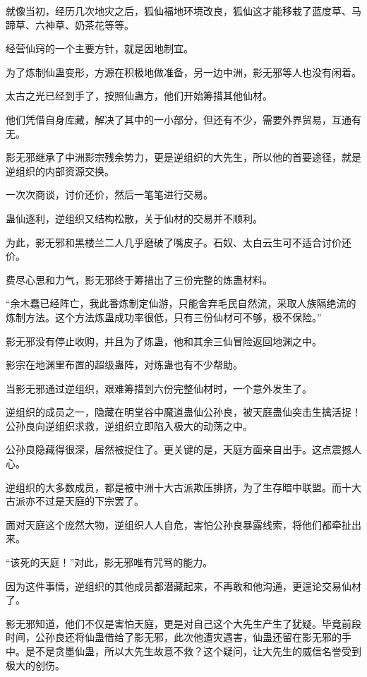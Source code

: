 \begin{this_body}
就像当初，经历几次地灾之后，狐仙福地环境改良，狐仙这才能移栽了蓝度草、马蹄草、六神草、奶茶花等等。

经营仙窍的一个主要方针，就是因地制宜。

为了炼制仙蛊变形，方源在积极地做准备，另一边中洲，影无邪等人也没有闲着。

太古之光已经到手了，按照仙蛊方，他们开始筹措其他仙材。

他们凭借自身库藏，解决了其中的一小部分，但还有不少，需要外界贸易，互通有无。

影无邪继承了中洲影宗残余势力，更是逆组织的大先生，所以他的首要途径，就是逆组织的内部资源交换。

一次次商谈，讨价还价，然后一笔笔进行交易。

蛊仙逐利，逆组织又结构松散，关于仙材的交易并不顺利。

为此，影无邪和黑楼兰二人几乎磨破了嘴皮子。石奴、太白云生可不适合讨价还价。

费尽心思和力气，影无邪终于筹措出了三份完整的炼蛊材料。

“余木蠢已经阵亡，我此番炼制定仙游，只能舍弃毛民自然流，采取人族隔绝流的炼制方法。这个方法炼蛊成功率很低，只有三份仙材可不够，极不保险。”

影无邪没有停止收购，并且为了炼蛊，他和其余三仙冒险返回地渊之中。

影宗在地渊里布置的超级蛊阵，对炼蛊也有不少帮助。

当影无邪通过逆组织，艰难筹措到六份完整仙材时，一个意外发生了。

逆组织的成员之一，隐藏在明堂谷中魔道蛊仙公孙良，被天庭蛊仙突击生擒活捉！公孙良向逆组织求救，逆组织立即陷入极大的动荡之中。

公孙良隐藏得很深，居然被捉住了。更关键的是，天庭方面亲自出手。这点震撼人心。

逆组织的大多数成员，都是被中洲十大古派欺压排挤，为了生存暗中联盟。而十大古派亦不过是天庭的下宗罢了。

面对天庭这个庞然大物，逆组织人人自危，害怕公孙良暴露线索，将他们都牵扯出来。

“该死的天庭！”对此，影无邪唯有咒骂的能力。

因为这件事情，逆组织的其他成员都潜藏起来，不再敢和他沟通，更遑论交易仙材了。

影无邪知道，他们不仅是害怕天庭，更是对自己这个大先生产生了犹疑。毕竟前段时间，公孙良还将仙蛊借给了影无邪，此次他遭灾遇害，仙蛊还留在影无邪的手中。是不是贪墨仙蛊，所以大先生故意不救？这个疑问，让大先生的威信名誉受到极大的创伤。


\end{this_body}
